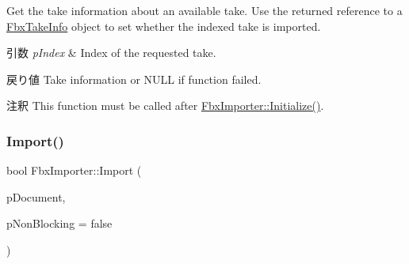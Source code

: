 Get the take information about an available take. Use the returned reference to a \hyperlink{class_fbx_take_info}{Fbx\+Take\+Info} object to set whether the indexed take is imported. 
\begin{DoxyParams}{引数}
{\em p\+Index} & Index of the requested take. \\
\hline
\end{DoxyParams}
\begin{DoxyReturn}{戻り値}
Take information or {\ttfamily N\+U\+LL} if function failed. 
\end{DoxyReturn}
\begin{DoxyRemark}{注釈}
This function must be called after \hyperlink{class_fbx_importer_a70528a9ca1ff737bda9696a2073acd13}{Fbx\+Importer\+::\+Initialize()}. 
\end{DoxyRemark}
\mbox{\label{class_fbx_importer_a1c5a7f9ee8a6952c1e039065cfa09659}} 
\subsubsection{\texorpdfstring{Import()}{Import()}\hspace{0.1cm}{\footnotesize\ttfamily [1/2]}}
{\footnotesize\ttfamily bool Fbx\+Importer\+::\+Import (\begin{DoxyParamCaption}\item[{\hyperlink{class_fbx_document}{Fbx\+Document} $\ast$}]{p\+Document,  }\item[{bool}]{p\+Non\+Blocking = {\ttfamily false} }\end{DoxyParamCaption})}

